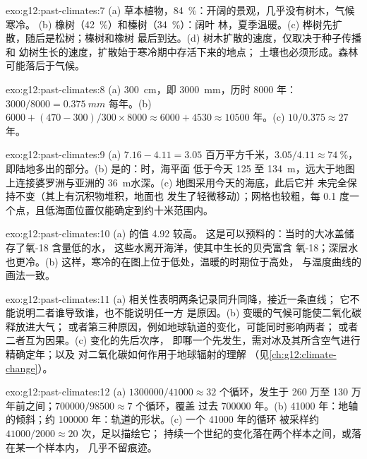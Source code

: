 \begin{solution}{exo:g12:past-climates:7}
(a) 草本植物，\qty{84}{\percent}：开阔的景观，几乎没有树木，气候寒冷。
(b) 橡树（\qty{42}{\percent}）和榛树（\qty{34}{\percent}）：阔叶
林，夏季温暖。(c) 桦树先扩散，随后是松树；榛树和橡树
最后到达。(d) 树木扩散的速度，仅取决于种子传播和
幼树生长的速度，扩散始于寒冷期中存活下来的地点；
土壤也必须形成。森林可能落后于气候。
\end{solution}

\begin{solution}{exo:g12:past-climates:8}
(a) \qty{300}{cm}，即 \qty{3000}{mm}，历时 \num{8000} 年：$3000/8000 =
\qty{0.375}{mm}$ 每年。(b) $\num{6000} + (470 - 300)/300 \times \num{8000}
\approx \num{6000} + \num{4530} \approx \num{10500}$ 年。(c) $10/0.375
\approx 27$ 年。
\end{solution}

\begin{solution}{exo:g12:past-climates:9}
(a) $7.16 - 4.11 = 3.05$ 百万平方千米，$3.05/4.11 \approx
\qty{74}{\percent}$，即陆地多出的部分。(b) 是的：时，海平面
低于今天 125 至 \qty{134}{m}，远大于地图上连接婆罗洲与亚洲的
\qty{36}{m}水深。(c) 地图采用今天的海底，此后它并
未完全保持不变（其上有沉积物堆积，地面也
发生了轻微移动）；网格也较粗，每 0.1
度一个点，且低海面位置仅能确定到约十米范围内。
\end{solution}

\begin{solution}{exo:g12:past-climates:10}
(a) 的值 \qty{4.92}{\permil} 较高。
这是可以预料的：当时的大冰盖储存了氧-18 含量低的水，
这些水离开海洋，使其中生长的贝壳富含
氧-18；深层水也更冷。(b) 这样，寒冷的在图上位于低处，温暖的时期位于高处，
与温度曲线的画法一致。
\end{solution}

\begin{solution}{exo:g12:past-climates:11}
(a) 相关性表明两条记录同升同降，接近一条直线；
它不能说明二者谁导致谁，也不能说明任一方
是原因。(b) 变暖的气候可能使二氧化碳释放进大气；
或者第三种原因，例如地球轨道的变化，可能同时影响两者；
或者二者互为因果。(c) 变化的先后次序，
即哪一个先发生，需对冰及其所含空气进行精确定年；以及
对二氧化碳如何作用于地球辐射的理解
（见\cref{ch:g12:climate-change}）。
\end{solution}

\begin{solution}{exo:g12:past-climates:12}
(a) $\num{1300000}/\num{41000} \approx 32$ 个循环，发生于 260 万至
130 万年前之间；$\num{700000}/\num{98500} \approx 7$ 个循环，覆盖
过去 \num{700000} 年。(b) \num{41000} 年：地轴的倾斜；约
\num{100000} 年：轨道的形状。(c) 一个 \num{41000} 年的循环
被采样约 $\num{41000}/\num{2000} \approx 20$ 次，足以描绘它；
持续一个世纪的变化落在两个样本之间，或落在某一个样本内，
几乎不留痕迹。
\end{solution}

